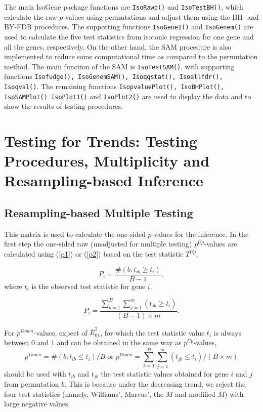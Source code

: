The main IsoGene package functions are \texttt{IsoRawp()} and
\texttt{IsoTestBH()}, which calculate the raw $p$-values using
permutations and adjust them using the BH- and BY-FDR procedures.
The supporting functions \texttt{IsoGene1()} and \texttt{IsoGenem()}
are used to calculate the five test statistics from isotonic
regression for one gene and all the genes, respectively. On the other hand,
the SAM procedure is also implemented to reduce some computational time as 
compared to the permutation method. The main function of the SAM is \texttt{IsoTestSAM()},
with supporting functions \texttt{Isofudge(), IsoGenemSAM(), Isoqqstat(), Isoallfdr(), Isoqval()}. 
The remaining functions \texttt{IsopvaluePlot(), IsoBHPlot(), IsoSAMPlot()
IsoPlot1()} and \texttt{IsoPlot2()} are used to display the data and
to show the results of testing procedures.

\section{Testing for Trends: Testing Procedures, Multiplicity and Resampling-based Inference}
\subsection{Resampling-based Multiple Testing}


This matrix is used to calculate the one-sided $p$-values for the
inference. In the first step the one-sided raw (unadjusted for
multiple testing) $p^{Up}$-values are calculated using (\ref{p1}) or
(\ref{p2}) based on the test statistic $T^{Up}$.

\begin{equation}
P_i=\frac{\#(b: t_{ib} \ge t_{i})}{B-1}, \label{p1}
\end{equation}
where $t_i$ is the observed test statistic for gene $i$.

\begin{equation}
P_i=\frac{\sum_{b=1}^{B} \sum_{j=1}^{m} (t_{jb}\ge
t_{i})}{(B-1) \times m} \label{p2}.
\end{equation}

For $p^{Down}$-values, expect of $\bar{E}^2_{01}$, for which the
test statistic value $t_i$ is always between 0 and 1 and can be
obtained in the same way as $p^{Up}$-values,
\[p^{Down}=\#(b:t_{ib} \le t_{i})/B\; \mbox{or}\; p^{Down}=\sum_{b=1}^{B}
\sum_{j=1}^{m} (t_{jb} \le t_{i})/(B \times m)\] should be used
with $t_{ib}$ and $t_{jb}$ the test statistic values obtained for
gene $i$ and $j$ from permutation $b$. This is because under the
decreasing trend, we reject the four test statistics (namely,
Williams', Marcus', the $M$ and modified $M$) with large negative
values.

